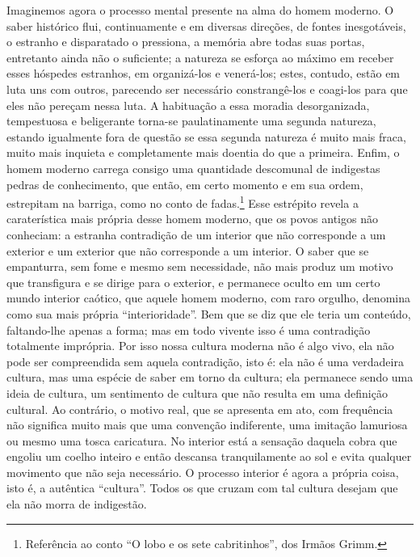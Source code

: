     Imaginemos agora o processo mental presente na alma do homem
    moderno. O saber histórico flui, continuamente e em diversas
    direções, de fontes inesgotáveis, o estranho e disparatado o
    pressiona, a memória abre todas suas portas, entretanto ainda não o
    suficiente; a natureza se esforça ao máximo em receber esses
    hóspedes estranhos, em organizá-los e venerá-los; estes, contudo,
    estão em luta uns com outros, parecendo ser necessário
    constrangê-los e coagi-los para que eles não pereçam nessa luta. A
    habituação a essa moradia desorganizada, tempestuosa e beligerante
    torna-se paulatinamente uma segunda natureza, estando igualmente
    fora de questão se essa segunda natureza é muito mais fraca, muito
    mais inquieta e completamente mais doentia do que a primeira. Enfim,
    o homem moderno carrega consigo uma quantidade descomunal de
    indigestas pedras de conhecimento, que então, em certo momento e em
    sua ordem, estrepitam na barriga, como no conto de fadas.\footnote{Referência
      ao conto ``O lobo e os sete cabritinhos'', dos Irmãos Grimm.}
    Esse estrépito revela a caraterística mais própria desse homem
    moderno, que os povos antigos não conheciam: a estranha contradição
    de um interior que não corresponde a um exterior e um exterior que
    não corresponde a um interior. O saber que se empanturra, sem fome e
    mesmo sem necessidade, não mais produz um motivo que transfigura e
    se dirige para o exterior, e permanece oculto em um certo mundo
    interior caótico, que aquele homem moderno, com raro orgulho,
    denomina como sua mais própria ``interioridade''. Bem que se diz que
    ele teria um conteúdo, faltando-lhe apenas a forma; mas em todo
    vivente isso é uma contradição totalmente imprópria. Por isso
    nossa cultura moderna não é algo vivo, ela não pode ser compreendida
    sem aquela contradição, isto é: ela não é uma verdadeira cultura,
    mas uma espécie de saber em torno da cultura; ela permanece sendo
    uma ideia de cultura, um sentimento de cultura que não resulta em
    uma definição cultural. Ao contrário, o motivo real, que se
    apresenta em ato, com frequência não significa muito mais que uma
    convenção indiferente, uma imitação lamuriosa ou mesmo uma tosca
    caricatura. No interior está a sensação daquela cobra que engoliu um
    coelho inteiro e então descansa tranquilamente ao sol e evita
    qualquer movimento que não seja necessário. O processo interior é
    agora a própria coisa, isto é, a autêntica ``cultura''. Todos os que
    cruzam com tal cultura desejam que ela não morra de indigestão.

